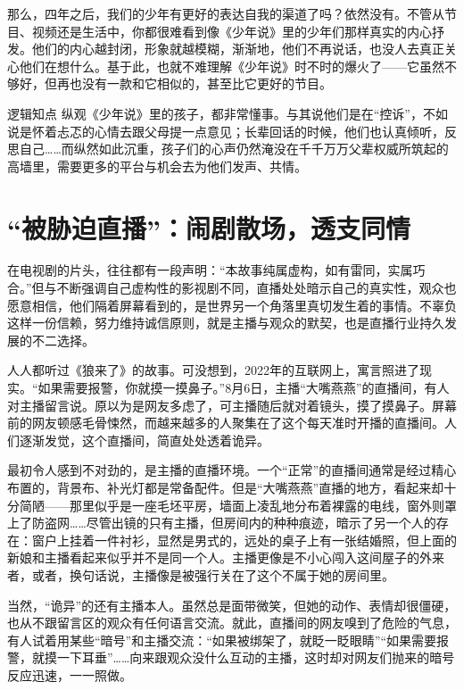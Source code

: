 那么，四年之后，我们的少年有更好的表达自我的渠道了吗？依然没有。不管从节目、视频还是生活中，你都很难看到像《少年说》里的少年们那样真实的内心抒发。他们的内心越封闭，形象就越模糊，渐渐地，他们不再说话，也没人去真正关心他们在想什么。基于此，也就不难理解《少年说》时不时的爆火了——它虽然不够好，但再也没有一款和它相似的，甚至比它更好的节目。

\begin{quoteBox}{逻辑知点}
纵观《少年说》里的孩子，都非常懂事。与其说他们是在“控诉”，不如说是怀着忐忑的心情去跟父母提一点意见；长辈回话的时候，他们也认真倾听，反思自己……而纵然如此沉重，孩子们的心声仍然淹没在千千万万父辈权威所筑起的高墙里，需要更多的平台与机会去为他们发声、共情。
\end{quoteBox}

\clearpage
\section*{“被胁迫直播”：闹剧散场，透支同情}

在电视剧的片头，往往都有一段声明：“本故事纯属虚构，如有雷同，实属巧合。”但与不断强调自己虚构性的影视剧不同，直播处处暗示自己的真实性，观众也愿意相信，他们隔着屏幕看到的，是世界另一个角落里真切发生着的事情。不辜负这样一份信赖，努力维持诚信原则，就是主播与观众的默契，也是直播行业持久发展的不二选择。

人人都听过《狼来了》的故事。可没想到，2022年的互联网上，寓言照进了现实。“如果需要报警，你就摸一摸鼻子。”8月6日，主播“大嘴燕燕”的直播间，有人对主播留言说。原以为是网友多虑了，可主播随后就对着镜头，摸了摸鼻子。屏幕前的网友顿感毛骨悚然，而越来越多的人聚集在了这个每天准时开播的直播间。人们逐渐发觉，这个直播间，简直处处透着诡异。

最初令人感到不对劲的，是主播的直播环境。一个“正常”的直播间通常是经过精心布置的，背景布、补光灯都是常备配件。但是“大嘴燕燕”直播的地方，看起来却十分简陋——那里似乎是一座毛坯平房，墙面上凌乱地分布着裸露的电线，窗外则罩上了防盗网……尽管出镜的只有主播，但房间内的种种痕迹，暗示了另一个人的存在：窗户上挂着一件衬衫，显然是男式的，远处的桌子上有一张结婚照，但上面的新娘和主播看起来似乎并不是同一个人。主播更像是不小心闯入这间屋子的外来者，或者，换句话说，主播像是被强行关在了这个不属于她的房间里。

当然，“诡异”的还有主播本人。虽然总是面带微笑，但她的动作、表情却很僵硬，也从不跟留言区的观众有任何语言交流。就此，直播间的网友嗅到了危险的气息，有人试着用某些“暗号”和主播交流：“如果被绑架了，就眨一眨眼睛”“如果需要报警，就摸一下耳垂”……向来跟观众没什么互动的主播，这时却对网友们抛来的暗号反应迅速，一一照做。

